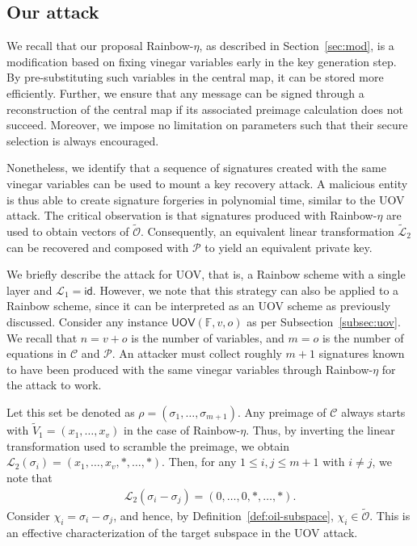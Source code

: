 \documentclass[12pt, a4paper, oneside]{memoir}
\theoremstyle{definition}
\begin{document}
\subsection{Our attack}\label{subsec:etaks}

We recall that our proposal Rainbow-$\eta$, as described in Section~\ref{sec:mod}, is a modification based on fixing vinegar variables early in the key generation step. By pre-substituting such variables in the central map, it can be stored more efficiently. Further, we ensure that any message can be signed through a reconstruction of the central map if its associated preimage calculation does not succeed. Moreover, we impose no limitation on parameters such that their secure selection is always encouraged.

Nonetheless, we identify that a sequence of signatures created with the same vinegar variables can be used to mount a key recovery attack. A malicious entity is thus able to create signature forgeries in polynomial time, similar to the UOV attack. The critical observation is that signatures produced with Rainbow-$\eta$ are used to obtain vectors of $\widetilde{\mathcal{O}}$. Consequently, an equivalent linear transformation $\widetilde{\mathcal{L}}_{2}$ can be recovered and composed with $\mathcal{P}$ to yield an equivalent private key.

We briefly describe the attack for UOV, that is, a Rainbow scheme with a single layer and $\mathcal{L}_{1} = \textsf{id}$. However, we note that this strategy can also be applied to a Rainbow scheme, since it can be interpreted as an UOV scheme as previously discussed. Consider any instance $\textsf{UOV}(\mathbb{F}, v, o)$ as per Subsection~\ref{subsec:uov}. We recall that $n = v + o$ is the number of variables, and $m = o$ is the number of equations in $\mathcal{C}$ and $\mathcal{P}$. An attacker must collect roughly $m + 1$ signatures known to have been produced with the same vinegar variables through Rainbow-$\eta$ for the attack to work. 

Let this set be denoted as $\rho = (\sigma_{1}, \dots, \sigma_{m + 1})$. Any preimage of $\mathcal{C}$ always starts with $\widetilde{V}_{1} = (x_{1}, \dots, x_{v})$ in the case of Rainbow-$\eta$. Thus, by inverting the linear transformation used to scramble the preimage, we obtain $\mathcal{L}_{2}(\sigma_{i}) = (x_{1}, \dots, x_{v}, \ast, \dots, \ast)$. Then, for any $1 \leq i, j \leq m + 1$ with $i \neq j$, we note that
\begin{align}
  \mathcal{L}_{2}(\sigma_{i} - \sigma_{j}) = (0, \dots, 0, \ast, \dots, \ast).
\end{align}
Consider $\chi_{i} = \sigma_{i} - \sigma_{j}$, and hence, by Definition~\ref{def:oil-subspace}, $\chi_{i} \in \widetilde{\mathcal{O}}$. This is an effective characterization of the target subspace in the UOV attack. 
\end{document}
